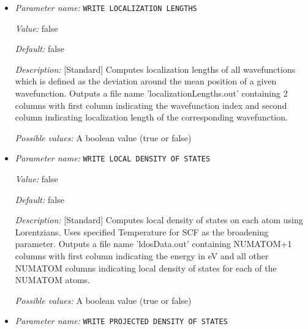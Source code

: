 \begin{itemize}
{\it Default:} false


{\it Description:} [Standard] Computes density of states using Lorentzians. Uses specified Temperature for SCF as the broadening parameter. Outputs a file name 'dosData.out' containing two columns with first column indicating the energy in eV and second column indicating the density of states


{\it Possible values:} A boolean value (true or false)
\item {\it Parameter name:} {\tt WRITE LOCALIZATION LENGTHS}
\label{parameters:Ground_2dstate derived computations/WRITE LOCALIZATION LENGTHS}
\label{parameters:Ground_2dstate_20derived_20computations/WRITE_20LOCALIZATION_20LENGTHS}


{\it Value:} false


{\it Default:} false


{\it Description:} [Standard] Computes localization lengths of all wavefunctions which is defined as the deviation around the mean position of a given wavefunction. Outputs a file name 'localizationLengths.out' containing 2 columns with first column indicating the wavefunction index and second column indicating localization length of the corresponding wavefunction.


{\it Possible values:} A boolean value (true or false)
\item {\it Parameter name:} {\tt WRITE LOCAL DENSITY OF STATES}
\label{parameters:Ground_2dstate derived computations/WRITE LOCAL DENSITY OF STATES}
\label{parameters:Ground_2dstate_20derived_20computations/WRITE_20LOCAL_20DENSITY_20OF_20STATES}


{\it Value:} false


{\it Default:} false


{\it Description:} [Standard] Computes local density of states on each atom using Lorentzians. Uses specified Temperature for SCF as the broadening parameter. Outputs a file name 'ldosData.out' containing NUMATOM+1 columns with first column indicating the energy in eV and all other NUMATOM columns indicating local density of states for each of the NUMATOM atoms.


{\it Possible values:} A boolean value (true or false)
\item {\it Parameter name:} {\tt WRITE PROJECTED DENSITY OF STATES}
\label{parameters:Ground_2dstate derived computations/WRITE PROJECTED DENSITY OF STATES}
\label{parameters:Ground_2dstate_20derived_20computations/WRITE_20PROJECTED_20DENSITY_20OF_20STATES}



\end{itemize}
